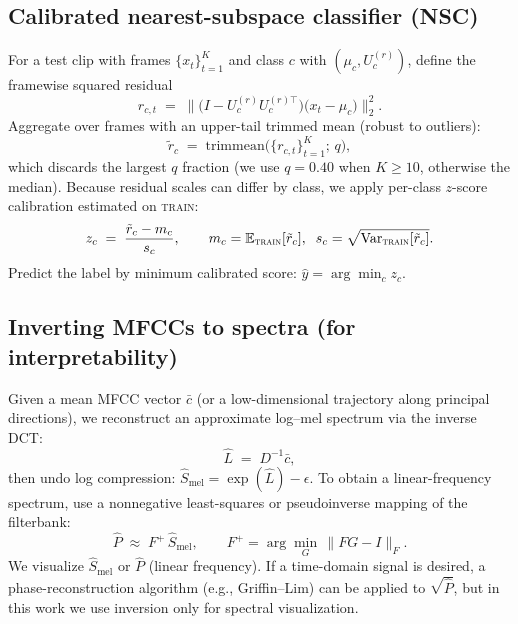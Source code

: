 \documentclass[11pt]{article}
\newcommand{\rankr}{\ensuremath{r}\xspace}
\newcommand{\NSC}{NSC\xspace}
\begin{document}
\subsection*{Calibrated nearest-subspace classifier (\NSC)}
For a test clip with frames $\{x_t\}_{t=1}^{K}$ and class $c$ with $(\mu_c,U_c^{(\rankr)})$, define the framewise squared residual
\begin{equation}
r_{c,t} \;=\; \big\|\big(I - U_c^{(\rankr)}U_c^{(\rankr)\top}\big)\big(x_t-\mu_c\big)\big\|_2^2.
\end{equation}
Aggregate over frames with an upper-tail trimmed mean (robust to outliers):
\begin{equation}
\tilde r_c \;=\; \mathrm{trimmean}\big(\{r_{c,t}\}_{t=1}^{K};\,q\big),
\end{equation}
which discards the largest $q$ fraction (we use $q=0.40$ when $K\ge 10$, otherwise the median). Because residual scales can differ by class, we apply per-class $z$-score calibration estimated on \textsc{train}:
\begin{equation}
z_c \;=\; \frac{\tilde r_c - m_c}{s_c},\qquad m_c=\mathbb{E}_{\textsc{train}}[\tilde r_c],\;\; s_c=\sqrt{\mathrm{Var}_{\textsc{train}}[\tilde r_c]}.
\end{equation}
Predict the label by minimum calibrated score: $\hat y=\arg\min_c z_c$.

\subsection*{Inverting MFCCs to spectra (for interpretability)}
Given a mean MFCC vector $\bar c$ (or a low-dimensional trajectory along principal directions), we reconstruct an approximate log–mel spectrum via the inverse DCT:
\begin{equation}
\widehat L \;=\; D^{-1}\bar c,
\end{equation}
then undo log compression: $\widehat S_{\mathrm{mel}}=\exp(\widehat L)-\epsilon$. To obtain a linear-frequency spectrum, use a nonnegative least-squares or pseudoinverse mapping of the filterbank:
\begin{equation}
\widehat P \;\approx\; F^{+}\,\widehat S_{\mathrm{mel}}, \qquad F^{+}=\arg\min_{G}\,\|FG-I\|_F.
\end{equation}
We visualize $\widehat S_{\mathrm{mel}}$ or $\widehat P$ (linear frequency). If a time-domain signal is desired, a phase-reconstruction algorithm (e.g., Griffin–Lim) can be applied to $\sqrt{\widehat P}$, but in this work we use inversion only for spectral visualization.
\end{document}
